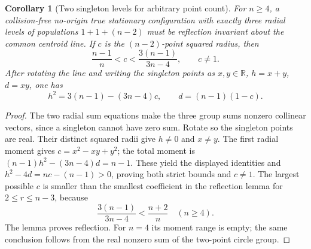 \documentclass[11pt]{article}
\newtheorem{corollary}[theorem]{Corollary}
\theoremstyle{remark}
\numberwithin{equation}{section}
\begin{document}
\begin{corollary}[Two singleton levels for arbitrary point count]
\label{cor:n8-oct7-general-singletons}
For $n\ge4$, a collision-free no-origin true stationary configuration
with exactly three radial levels of populations $1+1+(n-2)$ must
be reflection invariant about the common centroid line. If $c$ is
the $(n-2)$-point squared radius, then
\[
 \frac{n-1}{n}<c<\frac{3(n-1)}{3n-4},\qquad c\ne1.
\]
After rotating the line and writing the singleton points as
$x,y\in\mathbb R$, $h=x+y$, $d=xy$, one has
\[
 h^2=3(n-1)-(3n-4)c,\qquad d=(n-1)(1-c).
\]
\end{corollary}
\begin{proof}
The two radial sum equations make the three group sums nonzero
collinear vectors, since a singleton cannot have zero sum.
Rotate so the singleton points are real. Their distinct squared
radii give $h\ne0$ and $x\ne y$.
The first radial moment gives $c=x^2-xy+y^2$; the total moment is
$(n-1)h^2-(3n-4)d=n-1$. These yield the displayed identities and
$h^2-4d=nc-(n-1)>0$, proving both strict bounds and $c\ne1$.
The largest possible $c$ is smaller than the smallest coefficient
in the reflection lemma for $2\le r\le n-3$, because
\[
 \frac{3(n-1)}{3n-4}<\frac{n+2}{n}\quad(n\ge4).
\]
The lemma proves reflection. For $n=4$ its moment range is empty;
the same conclusion follows from the real nonzero sum of the
two-point circle group.
\end{proof}
\end{document}

